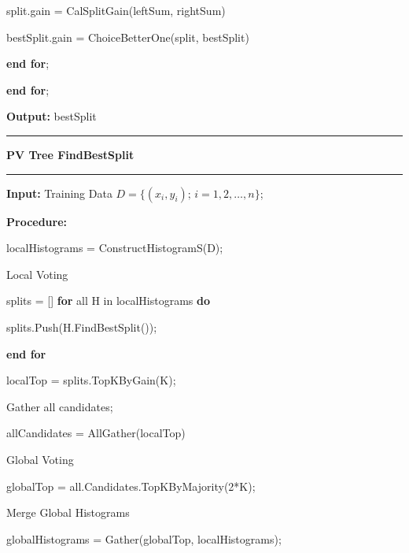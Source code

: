 \documentclass[a4paper]{article}
\begin{document}
\begin{enumerate}
						\hspace*{64pt}  split.gain = CalSplitGain(leftSum, rightSum)\par
						\hspace*{64pt}  bestSplit.gain = ChoiceBetterOne(split, bestSplit)\par
						\hspace*{48pt}  \textbf{end for};\par
						\hspace*{32pt}  \textbf{end for};\par
						\textbf{Output:} bestSplit\par
				\noindent\rule[0.10\baselineskip]{\textwidth}{0.5pt}
				\textbf{PV Tree FindBestSplit}\\
				\noindent\rule[0.10\baselineskip]{\textwidth}{0.5pt}
						\textbf{Input:} Training Data $D=\{(x_i,y_i);\, i = 1,2,\dots, n\}$;\par
						\textbf{Procedure:}\par
						\hspace*{32pt}	localHistograms = ConstructHistogramS(D);\par
						\hspace*{32pt}	Local Voting\par
						\hspace*{32pt}	splits = []
						\hspace*{32pt}	\textbf{for} all H in localHistograms \textbf{do}\par
						\hspace*{48pt}  splits.Push(H.FindBestSplit());\par
						\hspace*{32pt}	\textbf{end for}\par
						\hspace*{32pt}	localTop = splits.TopKByGain(K);\par
						\hspace*{32pt}	Gather all candidates;\par
						\hspace*{32pt}	allCandidates = AllGather(localTop)\par
						\hspace*{32pt}	Global Voting\par
						\hspace*{32pt}	globalTop = all.Candidates.TopKByMajority(2*K);\par
						\hspace*{32pt}	Merge Global Histograms\par
						\hspace*{32pt}	globalHistograms = Gather(globalTop, localHistograms);\par

\end{enumerate}
\end{document}
